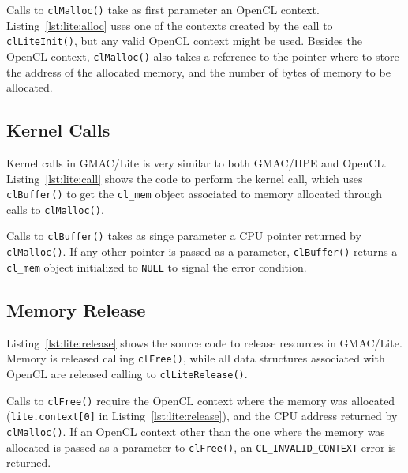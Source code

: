

Calls to \texttt{clMalloc()} take as first parameter an OpenCL context.  
Listing~\ref{lst:lite:alloc} uses one of the contexts created by the call to \texttt{clLiteInit()}, 
but any valid OpenCL context might be used. Besides the OpenCL context, \texttt{clMalloc()} also 
takes a reference to the pointer where to store the address of the allocated memory, and the number 
of bytes of memory to be allocated.

\subsection{Kernel Calls}
Kernel calls in GMAC\slash Lite is very similar to both GMAC\slash HPE and OpenCL\@.  
Listing~\ref{lst:lite:call} shows the code to perform the kernel call, which uses 
\texttt{clBuffer()} to get the \texttt{cl\_mem} object associated to memory allocated through calls 
to \texttt{clMalloc()}.



Calls to \texttt{clBuffer()} takes as singe parameter a CPU pointer returned by \texttt{clMalloc()}.  
If any other pointer is passed as a parameter, \texttt{clBuffer()} returns a \texttt{cl\_mem} object 
initialized to \texttt{NULL} to signal the error condition.

\subsection{Memory Release}
Listing~\ref{lst:lite:release} shows the source code to release resources in GMAC\slash Lite. Memory 
is released calling \texttt{clFree()}, while all data structures associated with OpenCL are released 
calling to \texttt{clLiteRelease()}.



Calls to \texttt{clFree()} require the OpenCL context where the memory was allocated 
(\texttt{lite.context[0]} in Listing~\ref{lst:lite:release}), and the CPU address returned by 
\texttt{clMalloc()}. If an OpenCL context other than the one where the memory was allocated is 
passed as a parameter to \texttt{clFree()}, an \texttt{CL\_INVALID\_CONTEXT} error is returned.

